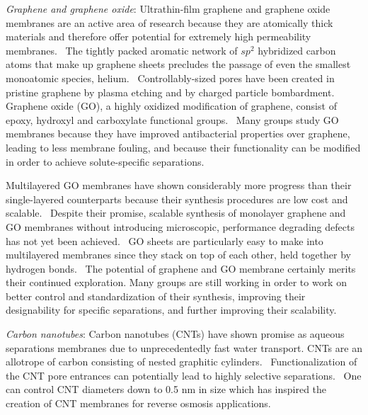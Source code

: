   \textit{Graphene and graphene oxide}: Ultrathin-film graphene and graphene oxide membranes
  are an active area of research because they are atomically thick materials and therefore 
  offer potential for extremely high permeability membranes.~\cite{humplik_nanostructured_2011} 
  The tightly packed aromatic network of $sp^2$ hybridized carbon atoms that make up 
  graphene sheets precludes the passage of even the smallest monoatomic species, helium.~\cite{bunch_impermeable_2008}
  Controllably-sized pores have been created in pristine graphene by plasma etching
  and by charged particle bombardment.~\cite{surwade_water_2015,russo_atom-by-atom_2012}
  Graphene oxide (GO), a highly oxidized modification of graphene, consist of epoxy,
  hydroxyl and carboxylate functional groups.~\cite{hegab_graphene_2015}
  Many groups study GO membranes because they have improved antibacterial properties 
  over graphene, leading to less membrane fouling, and because their functionality can be
  modified in order to achieve solute-specific separations.~\cite{liu_antibacterial_2011,he_bioinspired_2013}
  
  Multilayered GO membranes have shown considerably more progress than their single-layered
  counterparts because their synthesis procedures are low cost and scalable.~\cite{zhang_size-controlled_2009} 
  Despite their promise, scalable synthesis of monolayer graphene and GO membranes without
  introducing microscopic, performance degrading defects has not yet been achieved.~\cite{cohen-tanugi_multilayer_2016,wei_multilayered_2018} GO sheets are particularly easy to make into 
  multilayered membranes since they stack on top of each other,
  held together by hydrogen bonds.~\cite{homaeigohar_graphene_2017} The potential of 
  graphene and GO membrane certainly merits their continued exploration. Many groups are still
  working in order to work on better control and standardization of their synthesis, improving
  their designability for specific separations, and further improving their scalability.~\cite{wei_multilayered_2018}  
  
  \textit{Carbon nanotubes}: Carbon nanotubes (CNTs) have shown promise as aqueous 
  separations membranes due to unprecedentedly fast water transport.\cite{humplik_nanostructured_2011}
  CNTs are an allotrope of carbon consisting of nested graphitic cylinders.~\cite{iijima_helical_1991}
  Functionalization of the CNT pore entrances can potentially lead to highly selective 
  separations.~\cite{fornasiero_ion_2008} One can control CNT diameters down to 0.5 nm 
  in size which has inspired the creation of CNT membranes for reverse osmosis 
  applications.~\cite{sun_creating_2000} 
  
